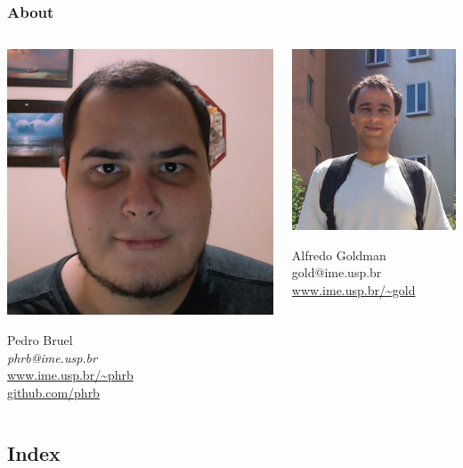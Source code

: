 \documentclass[10pt, compress, aspectratio=169]{beamer}
\begin{document}
\begin{frame}
    \frametitle{About}
    \begin{columns}[T,onlytextwidth]
        \begin{center}
            \includegraphics[width=.45\textwidth]{pedro}

            Pedro Bruel \\
            \emph{\alert{phrb}@ime.usp.br} \\[.3cm]
            \url{www.ime.usp.br/~phrb} \\
            \url{github.com/phrb} \\
        \end{center}

        \begin{center}
            \includegraphics[width=.4\textwidth]{alfredo}

            Alfredo Goldman \\
            \alert{gold}@ime.usp.br \\[.3cm]
            \url{www.ime.usp.br/~gold} \\
        \end{center}
    \end{columns}
\end{frame}

\subsection{Index}
\end{document}
